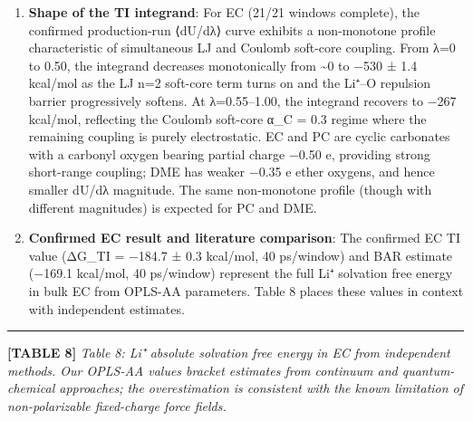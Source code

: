 \documentclass[
  11pt,
]{article}
\begin{document}
\begin{enumerate}
\def\labelenumi{\arabic{enumi}.}
\item
  \textbf{Shape of the TI integrand}: For EC (21/21 windows complete),
  the confirmed production-run ⟨dU/dλ⟩ curve exhibits a non-monotone
  profile characteristic of simultaneous LJ and Coulomb soft-core
  coupling. From λ=0 to 0.50, the integrand decreases monotonically from
  \textasciitilde0 to −530 ± 1.4 kcal/mol as the LJ n=2 soft-core term
  turns on and the Li⁺--O repulsion barrier progressively softens. At
  λ=0.55--1.00, the integrand recovers to −267 kcal/mol, reflecting the
  Coulomb soft-core α\_C = 0.3 regime where the remaining coupling is
  purely electrostatic. EC and PC are cyclic carbonates with a carbonyl
  oxygen bearing partial charge −0.50 e, providing strong short-range
  coupling; DME has weaker −0.35 e ether oxygens, and hence smaller
  dU/dλ magnitude. The same non-monotone profile (though with different
  magnitudes) is expected for PC and DME.
\item
  \textbf{Confirmed EC result and literature comparison}: The confirmed
  EC TI value (ΔG\_TI = −184.7 ± 0.3 kcal/mol, 40 ps/window) and BAR
  estimate (−169.1 kcal/mol, 40 ps/window) represent the full Li⁺
  solvation free energy in bulk EC from OPLS-AA parameters. Table 8
  places these values in context with independent estimates.
\end{enumerate}

\begin{center}\rule{0.5\linewidth}{0.5pt}\end{center}

\textbf{{[}TABLE 8{]}} \emph{Table 8: Li⁺ absolute solvation free energy
in EC from independent methods. Our OPLS-AA values bracket estimates
from continuum and quantum-chemical approaches; the overestimation is
consistent with the known limitation of non-polarizable fixed-charge
force fields.}
\end{document}

